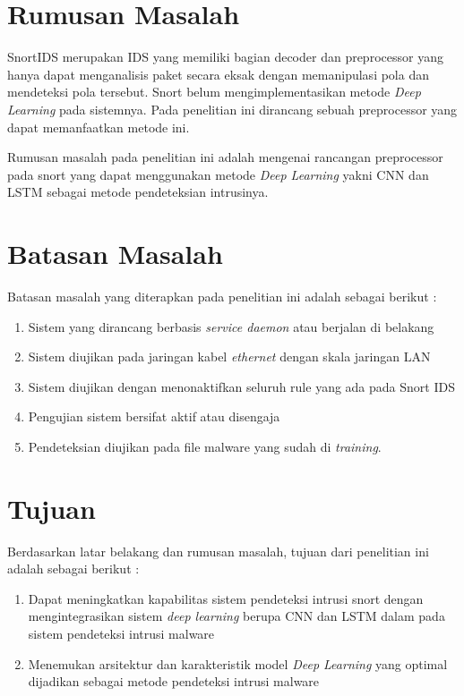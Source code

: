 \documentclass[skripsi.tex]{subfiles}
\begin{document}
\section{Rumusan Masalah} \label{rumusanmasalah}
\par SnortIDS merupakan IDS yang memiliki bagian decoder dan preprocessor yang hanya dapat menganalisis paket secara eksak dengan memanipulasi pola dan mendeteksi pola tersebut. Snort belum mengimplementasikan metode \textit{Deep Learning} pada sistemnya. Pada penelitian ini dirancang sebuah preprocessor yang dapat memanfaatkan metode ini.
\par Rumusan masalah pada penelitian ini adalah mengenai rancangan preprocessor pada snort yang dapat menggunakan metode \textit{Deep Learning} yakni CNN dan LSTM sebagai metode pendeteksian intrusinya.
\section{Batasan Masalah} \label{batasanmasalah}
Batasan masalah yang diterapkan pada penelitian ini adalah sebagai berikut :
\begin{enumerate}
    \item Sistem yang dirancang berbasis \textit{service daemon} atau berjalan di belakang
    \item Sistem diujikan pada jaringan kabel \textit{ethernet} dengan skala jaringan LAN
    \item Sistem diujikan dengan menonaktifkan seluruh rule yang ada pada Snort IDS
    \item Pengujian sistem bersifat aktif atau disengaja
    \item Pendeteksian diujikan pada file malware yang sudah di \textit{training}.
\end{enumerate}
\section{Tujuan}
Berdasarkan latar belakang dan rumusan masalah, tujuan dari penelitian ini adalah sebagai berikut :
\begin{enumerate}
    \item Dapat meningkatkan kapabilitas sistem pendeteksi intrusi snort dengan mengintegrasikan sistem \textit{deep learning} berupa CNN dan LSTM dalam pada sistem pendeteksi intrusi malware
    \item Menemukan arsitektur dan karakteristik model \textit{Deep Learning} yang optimal dijadikan sebagai metode pendeteksi intrusi malware
\end{enumerate}
\end{document}
